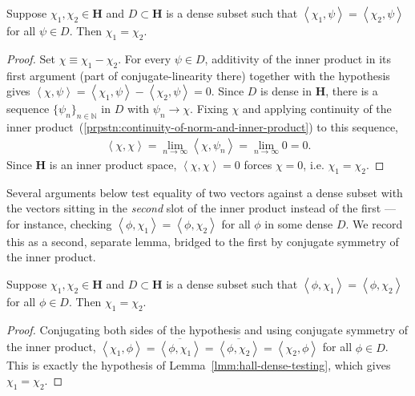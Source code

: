 \begin{lemma}
    \label{lmm:hall-dense-testing}
    \leanok
    Suppose $\chi_1, \chi_2 \in \mathbf{H}$ and $D \subset \mathbf{H}$ is a dense subset such that $\left< \chi_1, \psi \right> = \left< \chi_2, \psi \right>$ for all $\psi \in D$. Then $\chi_1 = \chi_2$.
\end{lemma}
\begin{proof}
    \leanok
Set $\chi \equiv \chi_1 - \chi_2$. For every $\psi \in D$, additivity of the inner product in its first argument (part of conjugate-linearity there) together with the hypothesis gives $\left< \chi, \psi \right> = \left< \chi_1, \psi \right> - \left< \chi_2, \psi \right> = 0$. Since $D$ is dense in $\mathbf{H}$, there is a sequence $\{ \psi_n \}_{n \in \mathbb{N}}$ in $D$ with $\psi_n \to \chi$. Fixing $\chi$ and applying continuity of the inner product~(\ref{prpstn:continuity-of-norm-and-inner-product}) to this sequence,
\begin{align}
    \left< \chi, \chi \right> = \lim_{n \to \infty} \left< \chi, \psi_n \right> = \lim_{n \to \infty} 0 = 0.
\end{align}
Since $\mathbf{H}$ is an inner product space, $\left< \chi, \chi \right> = 0$ forces $\chi = 0$, i.e. $\chi_1 = \chi_2$.
\end{proof}

Several arguments below test equality of two vectors against a dense subset with the vectors sitting in the \textit{second} slot of the inner product instead of the first — for instance, checking $\left< \phi, \chi_1 \right> = \left< \phi, \chi_2 \right>$ for all $\phi$ in some dense $D$. We record this as a second, separate lemma, bridged to the first by conjugate symmetry of the inner product.

\begin{lemma}
    \label{lmm:hall-dense-testing-second-slot}
    \leanok
    Suppose $\chi_1, \chi_2 \in \mathbf{H}$ and $D \subset \mathbf{H}$ is a dense subset such that $\left< \phi, \chi_1 \right> = \left< \phi, \chi_2 \right>$ for all $\phi \in D$. Then $\chi_1 = \chi_2$.
\end{lemma}
\begin{proof}
    \leanok
Conjugating both sides of the hypothesis and using conjugate symmetry of the inner product, $\left< \chi_1, \phi \right> = \overline{\left< \phi, \chi_1 \right>} = \overline{\left< \phi, \chi_2 \right>} = \left< \chi_2, \phi \right>$ for all $\phi \in D$. This is exactly the hypothesis of Lemma~\ref{lmm:hall-dense-testing}, which gives $\chi_1 = \chi_2$.
\end{proof}

